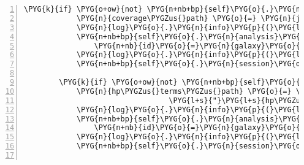 \begin{Verbatim}[commandchars=\\\{\},numbers=left,firstnumber=1,stepnumber=5]
        \PYG{k}{if} \PYG{o+ow}{not} \PYG{n+nb+bp}{self}\PYG{o}{.}\PYG{n}{analysis}\PYG{o}{.}\PYG{n}{galaxy\PYGZus{}coverage}\PYG{p}{:}
            \PYG{n}{coverage\PYGZus{}path} \PYG{o}{=} \PYG{n}{join}\PYG{p}{(}\PYG{n+nb+bp}{self}\PYG{o}{.}\PYG{n}{analysis}\PYG{o}{.}\PYG{n}{data\PYGZus{}dir}\PYG{p}{,} \PYG{l+s}{"}\PYG{l+s}{coverage.bigwig}\PYG{l+s}{"}\PYG{p}{)}
            \PYG{n}{log}\PYG{o}{.}\PYG{n}{info}\PYG{p}{(}\PYG{l+s}{"}\PYG{l+s}{uploading coverage.bigwig to galaxy}\PYG{l+s}{"}\PYG{p}{)}
            \PYG{n+nb+bp}{self}\PYG{o}{.}\PYG{n}{analysis}\PYG{o}{.}\PYG{n}{galaxy\PYGZus{}coverage} \PYG{o}{=} \PYG{n}{GalaxyDataset}\PYG{p}{(}
                \PYG{n+nb}{id}\PYG{o}{=}\PYG{n}{galaxy}\PYG{o}{.}\PYG{n}{upload}\PYG{p}{(}\PYG{n+nb}{open}\PYG{p}{(}\PYG{n}{coverage\PYGZus{}path}\PYG{p}{)}\PYG{p}{,} \PYG{n+nb+bp}{self}\PYG{o}{.}\PYG{n}{coverage\PYGZus{}name}\PYG{p}{)}\PYG{p}{)}
            \PYG{n}{log}\PYG{o}{.}\PYG{n}{info}\PYG{p}{(}\PYG{l+s}{"}\PYG{l+s}{...done - id: }\PYG{l+s+si}{\PYGZpc{}s}\PYG{l+s}{"} \PYG{o}{\PYGZpc{}} \PYG{n+nb+bp}{self}\PYG{o}{.}\PYG{n}{analysis}\PYG{o}{.}\PYG{n}{galaxy\PYGZus{}coverage}\PYG{o}{.}\PYG{n}{id}\PYG{p}{)}
            \PYG{n+nb+bp}{self}\PYG{o}{.}\PYG{n}{session}\PYG{o}{.}\PYG{n}{commit}\PYG{p}{(}\PYG{p}{)}

        \PYG{k}{if} \PYG{o+ow}{not} \PYG{n+nb+bp}{self}\PYG{o}{.}\PYG{n}{analysis}\PYG{o}{.}\PYG{n}{galaxy\PYGZus{}hp\PYGZus{}terms}\PYG{p}{:}
            \PYG{n}{hp\PYGZus{}terms\PYGZus{}path} \PYG{o}{=} \PYG{n}{join}\PYG{p}{(}\PYG{n+nb+bp}{self}\PYG{o}{.}\PYG{n}{analysis}\PYG{o}{.}\PYG{n}{data\PYGZus{}dir}\PYG{p}{,}
                                 \PYG{l+s}{"}\PYG{l+s}{hp\PYGZus{}terminators.bigbed}\PYG{l+s}{"}\PYG{p}{)}
            \PYG{n}{log}\PYG{o}{.}\PYG{n}{info}\PYG{p}{(}\PYG{l+s}{"}\PYG{l+s}{uploading hp\PYGZus{}terminators.bigbed to galaxy}\PYG{l+s}{"}\PYG{p}{)}
            \PYG{n+nb+bp}{self}\PYG{o}{.}\PYG{n}{analysis}\PYG{o}{.}\PYG{n}{galaxy\PYGZus{}hp\PYGZus{}terms} \PYG{o}{=} \PYG{n}{GalaxyDataset}\PYG{p}{(}
                \PYG{n+nb}{id}\PYG{o}{=}\PYG{n}{galaxy}\PYG{o}{.}\PYG{n}{upload}\PYG{p}{(}\PYG{n+nb}{open}\PYG{p}{(}\PYG{n}{hp\PYGZus{}terms\PYGZus{}path}\PYG{p}{)}\PYG{p}{,} \PYG{n+nb+bp}{self}\PYG{o}{.}\PYG{n}{hp\PYGZus{}terms\PYGZus{}name}\PYG{p}{)}\PYG{p}{)}
            \PYG{n}{log}\PYG{o}{.}\PYG{n}{info}\PYG{p}{(}\PYG{l+s}{"}\PYG{l+s}{...done - id: }\PYG{l+s+si}{\PYGZpc{}s}\PYG{l+s}{"} \PYG{o}{\PYGZpc{}} \PYG{n+nb+bp}{self}\PYG{o}{.}\PYG{n}{analysis}\PYG{o}{.}\PYG{n}{galaxy\PYGZus{}hp\PYGZus{}terms}\PYG{o}{.}\PYG{n}{id}\PYG{p}{)}
            \PYG{n+nb+bp}{self}\PYG{o}{.}\PYG{n}{session}\PYG{o}{.}\PYG{n}{commit}\PYG{p}{(}\PYG{p}{)}


\end{Verbatim}
